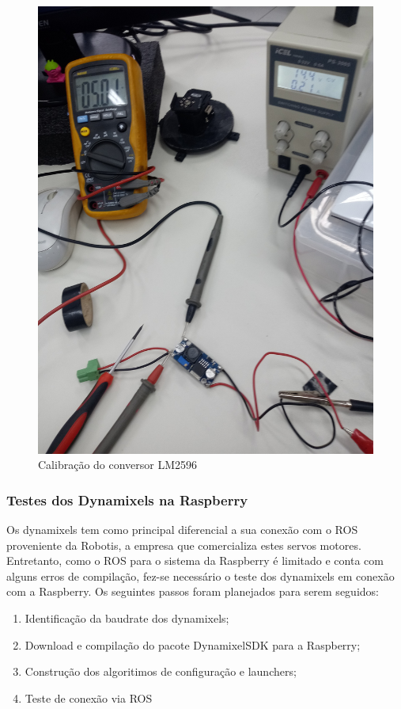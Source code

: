 \begin{figure}[H]
	\centering
	\includegraphics[scale=0.4, angle=0]{Figures/conversor2.jpg}
	\caption{Calibração do conversor LM2596}
	\label{fig:con2}
\end{figure}

\subsubsection{Testes dos Dynamixels na Raspberry}
Os dynamixels tem como principal diferencial a sua conexão com o ROS proveniente da Robotis, a empresa que comercializa estes servos motores. Entretanto, como o ROS para o sistema da Raspberry é limitado e conta com alguns erros de compilação, fez-se necessário o teste dos dynamixels em conexão com a Raspberry. Os seguintes passos foram planejados para serem seguidos:

\begin{enumerate}
	\item Identificação da baudrate dos dynamixels;
	\item Download e compilação do pacote DynamixelSDK para a Raspberry;
	\item Construção dos algoritimos de configuração e launchers;
	\item Teste de conexão via ROS
\end{enumerate}

